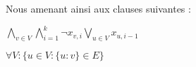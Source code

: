 \documentclass[a4paper]{article}
\begin{document}
\begin{enumerate}
Nous amenant ainsi aux clauses suivantes : \\
\begin{center}
$\bigwedge\limits_{v∈V}^{} \bigwedge\limits_{i=1}^{k} \neg x_{v,i} \bigvee\limits_{u∈V}^{} x_{u,i-1}$
\end{center}

\begin{center}
$\forall V:\{u∈V:\{u:v\}∈E\}$
\end{center}


\end{enumerate}

\end{document}

